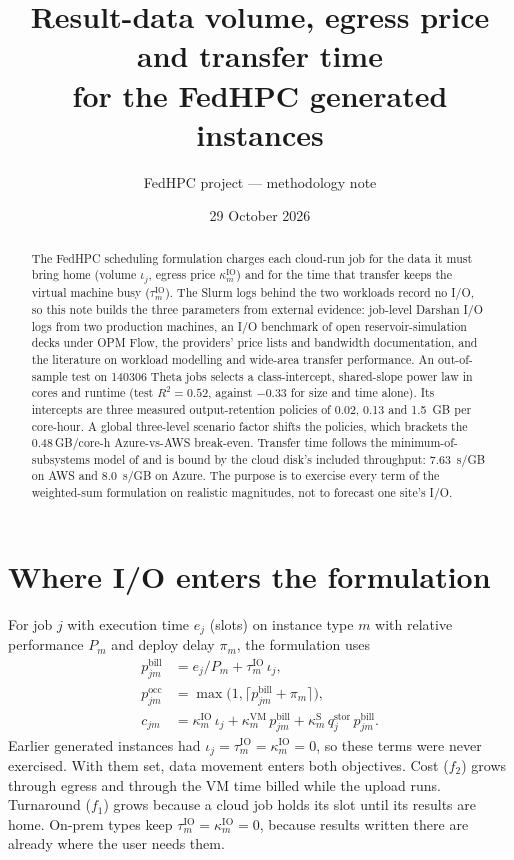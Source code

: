 \documentclass[11pt,a4paper]{article}
\title{Result-data volume, egress price and transfer time\\for the FedHPC generated instances}
\author{FedHPC project --- methodology note}
\date{29 October 2026}
\newcommand{\ioVol}{\iota_j}
\newcommand{\tauIO}{\tau^{\mathrm{IO}}}
\newcommand{\kapIO}{\kappa^{\mathrm{IO}}}
\begin{document}
\maketitle

\begin{abstract}
The FedHPC scheduling formulation charges each cloud-run job for the data it must
bring home (volume $\ioVol$, egress price $\kapIO_m$) and for the time that
transfer keeps the virtual machine busy ($\tauIO_m$). The Slurm logs behind the
two workloads record no I/O, so this note builds the three parameters from external
evidence: job-level Darshan I/O logs from two production machines, an I/O benchmark
of open reservoir-simulation decks under OPM Flow, the providers' price lists and
bandwidth documentation, and the literature on workload modelling and wide-area
transfer performance. An out-of-sample test on \num{140306} Theta jobs selects a
class-intercept, shared-slope power law in cores and runtime (test $R^2=0.52$,
against $-0.33$ for size and time alone). Its intercepts are three measured
output-retention policies of 0.02, 0.13 and \SI{1.5}{GB} per core-hour. A global
three-level scenario factor shifts the policies, which brackets the
0.48\,GB/core-h Azure-vs-AWS break-even. Transfer time follows the
minimum-of-subsystems model of \citet{liu2017explaining} and is bound by the cloud
disk's included throughput: \SI{7.63}{s/GB} on AWS and \SI{8.0}{s/GB} on Azure.
The purpose is to exercise every term of the weighted-sum formulation on realistic
magnitudes, not to forecast one site's I/O.
\end{abstract}

\section{Where I/O enters the formulation}\label{sec:formulation}
For job $j$ with execution time $e_j$ (slots) on instance type $m$ with relative
performance $P_m$ and deploy delay $\pi_m$, the formulation uses
\begin{align}
  p^{\mathrm{bill}}_{jm} &= e_j / P_m + \tauIO_m\, \ioVol, \label{eq:pbill}\\
  p^{\mathrm{occ}}_{jm}  &= \max\bigl(1, \lceil p^{\mathrm{bill}}_{jm} + \pi_m \rceil\bigr), \label{eq:pocc}\\
  c_{jm} &= \kapIO_m\, \ioVol + \kappa^{\mathrm{VM}}_m\, p^{\mathrm{bill}}_{jm}
           + \kappa^{\mathrm{S}}_m\, q^{\mathrm{stor}}_j\, p^{\mathrm{bill}}_{jm}. \label{eq:cost}
\end{align}
Earlier generated instances had $\ioVol=\tauIO_m=\kapIO_m=0$, so these terms
were never exercised. With them set, data movement enters both objectives. Cost
($f_2$) grows through egress and through the VM time billed while the upload runs.
Turnaround ($f_1$) grows because a cloud job holds its slot until its results are
home. On-prem types keep $\tauIO_m=\kapIO_m=0$, because results written there are
already where the user needs them.
\end{document}
